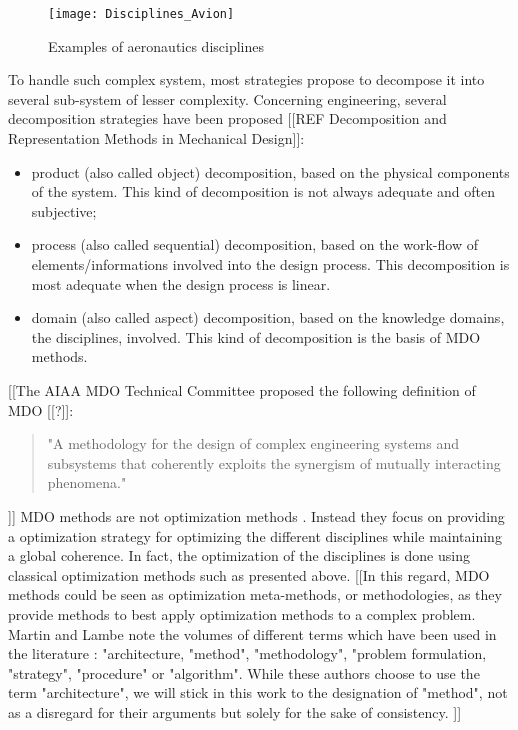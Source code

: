 \begin{figure}
\centering
\texttt{[image: Disciplines\_Avion]}
\caption{Examples of aeronautics disciplines}
\label{aero-disc}
\end{figure}

To handle such complex system, most strategies propose to decompose it into several sub-system of lesser complexity. Concerning engineering, several decomposition strategies have been proposed [[REF Decomposition and Representation Methods in Mechanical Design]]:

\begin{itemize}
\item product (also called object) decomposition, based on the physical components of the system. This kind of decomposition is not always adequate and often subjective;
\item process  (also called sequential) decomposition, based on the work-flow of elements/informations involved into the design process. This decomposition is most adequate when the design process is linear.
\item domain (also called aspect) decomposition, based on the knowledge domains, the disciplines, involved. This kind of decomposition is the basis of MDO methods.
\end{itemize}

[[The AIAA MDO Technical Committee proposed the following definition of MDO [[\cite{american1991current}?]]:
 \begin{quote}
"A methodology for the design of complex engineering systems and subsystems that coherently exploits the synergism of mutually interacting phenomena."
\end{quote}]]
MDO methods are not optimization methods . Instead they focus on providing a optimization strategy for optimizing the different disciplines while maintaining a global coherence. In fact, the optimization of the disciplines is done using classical optimization methods such as presented above. [[In this regard, MDO methods could be seen as optimization meta-methods, or methodologies, as they provide methods to best apply optimization methods to a complex problem. Martin and Lambe\cite{Lambe:2011:A} note the volumes of different terms which have been used in the literature :  "architecture, "method", "methodology", "problem formulation, "strategy", "procedure" or "algorithm". While these authors choose to use the term "architecture", we will stick in this work to the designation of "method", not as a disregard for their arguments but solely for the sake of  consistency.  ]] 

